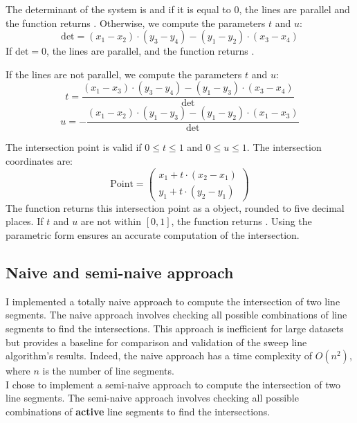 \documentclass[10pt,a4paper,hidelinks]{article}
\begin{document}
The determinant of the system is and if it is equal to 0, the lines are parallel and the function returns . Otherwise, we compute the parameters $t$ and $u$:
$$\text{det} = (x_1 - x_2) \cdot (y_3 - y_4) - (y_1 - y_2) \cdot (x_3 - x_4)$$
If $\text{det} = 0$, the lines are parallel, and the function returns .

If the lines are not parallel, we compute the parameters $t$ and $u$:
$$t = \frac{(x_1 - x_3) \cdot (y_3 - y_4) - (y_1 - y_3) \cdot (x_3 - x_4)}{\text{det}}$$
$$u = -\frac{(x_1 - x_2) \cdot (y_1 - y_3) - (y_1 - y_2) \cdot (x_1 - x_3)}{\text{det}}$$

The intersection point is valid if $0 \leq t \leq 1$ and $0 \leq u \leq 1$. The intersection coordinates are:
$$
\text{Point} = 
\begin{pmatrix}
    x_1 + t \cdot (x_2 - x_1)\\
    y_1 + t \cdot (y_2 - y_1)
\end{pmatrix}
$$
The function returns this intersection point as a  object, rounded to five decimal places. If $t$ and $u$ are not within $[0, 1]$, the function returns . Using the parametric form ensures an accurate computation of the intersection.

\subsection{Naive and semi-naive approach}
I implemented a totally naive approach to compute the intersection of two line segments. The naive approach involves checking all possible combinations of line segments to find the intersections. This approach is inefficient for large datasets but provides a baseline for comparison and validation of the sweep line algorithm's results. Indeed, the naive approach has a time complexity of $O(n^2)$, where $n$ is the number of line segments.\\

I chose to implement a semi-naive approach to compute the intersection of two line segments. The semi-naive approach involves checking all possible combinations of \textbf{active} line segments to find the intersections.
\end{document}
